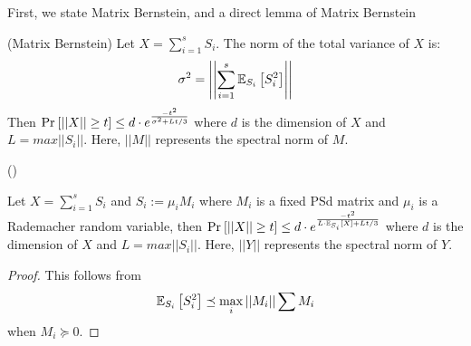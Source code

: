 \documentclass[12pt]{article}
\begin{document}
  First, we state Matrix Bernstein, and a direct lemma of Matrix Bernstein  
  \begin{theorem} (Matrix Bernstein)
    Let $X = \sum_{i=1}^s S_i$. The norm of the total variance of $X$ is:
    \begin{align}
      \sigma^2 = \left| \left| \sum_{i=1}^s {\mathbb{E}}_{S_i}\left[ S_i^2 \right] \right| \right|
    \end{align}
    Then $\mbox{Pr}_{}\left[ ||X|| \geq t \right] \leq d \cdot e^{\frac{-t^2}{\sigma^2 + Lt/3}}$
    where $d$ is the dimension of $X$ and $L = max||S_i||$. Here, $||M ||$ represents the spectral norm of $M$.

    ()
  \end{theorem}
  \begin{lemma} \label{lem:matrix-azuma}
    Let $X = \sum_{i=1}^s S_i$ and $S_i := \mu_i M_i$ where $M_i$ is a fixed PSd matrix and
    $\mu_i$ is a Rademacher random variable, 
    then $\mbox{Pr}_{}\left[ ||X|| \geq t \right] \leq d \cdot e^{\frac{-t^2}{L \cdot {\mathbb{E}}_{S_i}\left[ X \right]+ Lt/3}}$
    where $d$ is the dimension of $X$ and $L = max||S_i||$.
    Here, $||Y ||$ represents the spectral norm of $Y$.
  \end{lemma}
  \begin{proof} This follows from
    \begin{align}
    {\mathbb{E}}_{S_i}\left[ S_i^2 \right] \preceq \max_{i}||M_i|| \sum{M_i} 
    \end{align}
    when $M_i \succeq 0$.

  \end{proof}
\end{document}
